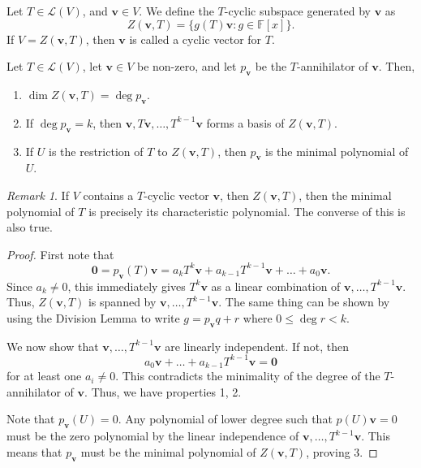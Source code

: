 \documentclass[11pt]{article}
\newcommand{\F}{\mathbb{F}}
\renewcommand{\vec}[1]{\boldsymbol{#1}}
\newcommand{\vv}{\vec{v}}
\newcommand{\alg}[1]{\mathscr{#1}}
\newcommand{\algL}{\alg{L}}
\theoremstyle{definition}
\theoremstyle{remark}
\newtheorem*{remark}{Remark}
\numberwithin{equation}{section}
\begin{document}
    \begin{definition}
        Let $T \in \algL(V)$, and $\vv \in V$. We define the $T$-cyclic subspace
        generated by $\vv$ as \[
            Z(\vv, T) = \{g(T)\vv: g\in \F[x]\}.
        \]
        If $V = Z(\vv, T)$, then $\vv$ is called a cyclic vector for $T$.
    \end{definition}

    \begin{theorem}
        Let $T \in \algL(V)$, let $\vv \in V$ be non-zero, and let $p_{\vv}$ be the
        $T$-annihilator of $\vv$. Then,
        \begin{enumerate}
            \itemsep0em
            \item $\dim{Z(\vv, T)} = \deg{p_{\vv}}$.
            \item If $\deg{p_{\vv}} = k$, then $\vv, T\vv, \dots, T^{k - 1}\vv$ forms a
            basis of $Z(\vv, T)$.
            \item If $U$ is the restriction of $T$ to $Z(\vv, T)$, then $p_{\vv}$ is
            the minimal polynomial of $U$.
        \end{enumerate}
        \begin{remark}
            If $V$ contains a $T$-cyclic vector $\vv$, then $Z(\vv, T)$, then the
            minimal polynomial of $T$ is precisely its characteristic polynomial. The
            converse of this is also true.
        \end{remark}
    \end{theorem}
    \begin{proof}
        First note that \[
            \vec{0} = p_{\vv}(T)\vv = a_kT^k\vv + a_{k - 1}T^{k - 1}\vv + \dots +
            a_0\vv.
        \] Since $a_k \neq 0$, this immediately gives $T^k\vv$ as a linear combination
        of $\vv, \dots, T^{k - 1}\vv$. Thus, $Z(\vv, T)$ is spanned by $\vv, \dots,
        T^{k - 1}\vv$. The same thing can be shown by using the Division Lemma to
        write $g = p_{\vv}q + r$ where $0 \leq \deg{r} < k$.

        We now show that $\vv, \dots, T^{k - 1}\vv$ are linearly independent. If not,
        then \[
            a_0\vv + \dots + a_{k - 1}T^{k - 1}\vv = \vec{0}
        \] for at least one $a_i \neq 0$. This contradicts the minimality of the
        degree of the $T$-annihilator of $\vv$. Thus, we have properties 1, 2.

        Note that $p_{\vv}(U) = 0$. Any polynomial of lower degree such that $p(U)\vv
        = 0$ must be the zero polynomial by the linear independence of $\vv, \dots,
        T^{k - 1}\vv$. This means that $p_{\vv}$ must be the minimal polynomial of
        $Z(\vv, T)$, proving 3.
    \end{proof}
\end{document}
